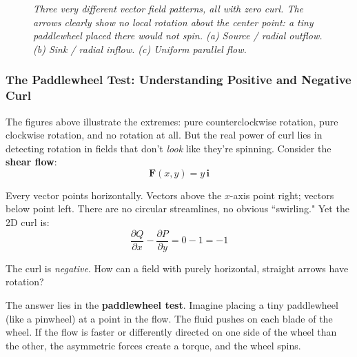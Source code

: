 \begin{figure}[H]
\caption{\textit{Three very different vector field patterns, all with zero curl. The arrows clearly show no local rotation about the center point: a tiny paddlewheel placed there would not spin. (a) Source / radial outflow. (b) Sink / radial inflow. (c) Uniform parallel flow.}}
\label{fig:zero_curl_patterns}
\end{figure}

\subsubsection*{The Paddlewheel Test: Understanding Positive and Negative Curl}

\noindent The figures above illustrate the extremes: pure counterclockwise rotation, pure clockwise rotation, and no rotation at all. But the real power of curl lies in detecting rotation in fields that don't \textit{look} like they're spinning. Consider the \textbf{shear flow}:
\[
\mathbf{F}(x,y) = y\,\mathbf{i}
\]

\noindent Every vector points horizontally. Vectors above the $x$-axis point right; vectors below point left. There are no circular streamlines, no obvious ``swirling." Yet the 2D curl is:
\[
\frac{\partial Q}{\partial x} - \frac{\partial P}{\partial y} = 0 - 1 = -1
\]

\noindent The curl is \textit{negative}. How can a field with purely horizontal, straight arrows have rotation?

\medskip

\noindent The answer lies in the \textbf{paddlewheel test}. Imagine placing a tiny paddlewheel (like a pinwheel) at a point in the flow. The fluid pushes on each blade of the wheel. If the flow is faster or differently directed on one side of the wheel than the other, the asymmetric forces create a torque, and the wheel spins.

